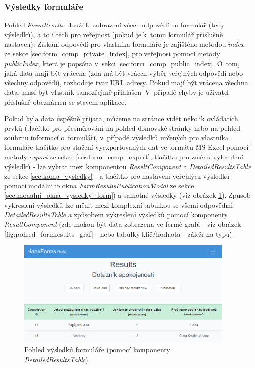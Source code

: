 		\subsubsection{Výsledky formuláře}\label{sec:pohled_vysledky_formulare} %
		Pohled \textit{FormResults} slouží k~zobrazení všech odpovědí na formulář (tedy výsledků), a to i těch pro veřejnost (pokud je k~tomu formulář příslušně nastaven). Získání odpovědí pro vlastníka formuláře je zajištěno metodou \textit{index} ze sekce \ref{sec:form_comp_private_index}, pro veřejnost pomocí metody \textit{publicIndex}, která je popsána v~sekci \ref{sec:form_comp_public_index}. O~tom, jaká data mají být vrácena (zda má být vrácen výběr veřejných odpovědí nebo všechny odpovědi), rozhoduje tvar URL adresy. Pokud mají být vrácena všechna data, musí být vlastník samozřejmě přihlášen. V~případě chyby je uživatel příslušně obeznámen se stavem aplikace.
		
		Pokud byla data úspěšně přijata, můžeme na stránce vidět několik ovládacích prvků (tlačítko pro přesměrování na pohled domovské stránky nebo na pohled souhrnu informací o~formuláři, v~případě výsledků určených pro vlastníka formuláře tlačítko pro stažení vyexportovaných dat ve formátu MS Excel pomocí metody \textit{export} ze sekce \ref{sec:form_comp_export}, tlačítko pro změnu vykreslení výsledků - lze vybrat mezi komponentou \textit{ResultComponent} a \textit{DetailedResultsTable} ze sekce \ref{sec:komp_vysledky} - a tlačítko pro nastavení veřejných výsledků pomocí modálního okna \textit{FormResultsPublicationModal} ze sekce \ref{sec:modalni_okna_vysledky_form}) a samotné výsledky (viz obrázek \ref{fig:pohled_formresults}). Způsob vykreslení výsledků lze měnit mezi komplexní tabulkou se všemi odpovědmi \textit{DetailedResultsTable} a způsobem vykreslení výsledků  pomocí komponenty \textit{ResultComponent} (zde mohou být data zobrazena ve formě grafů - viz obrázek \ref{fig:pohled_formresults_graf} - nebo tabulky klíč/hodnota - záleží na typu).
		
		\begin{figure}[h]
			\centering
			\includegraphics[width=0.95\textwidth]{img/pohledy/formresults.png}
			\caption{Pohled výsledků formuláře (pomocí komponenty \textit{DetailedResultsTable})}
			\label{fig:pohled_formresults}
		\end{figure}
	
